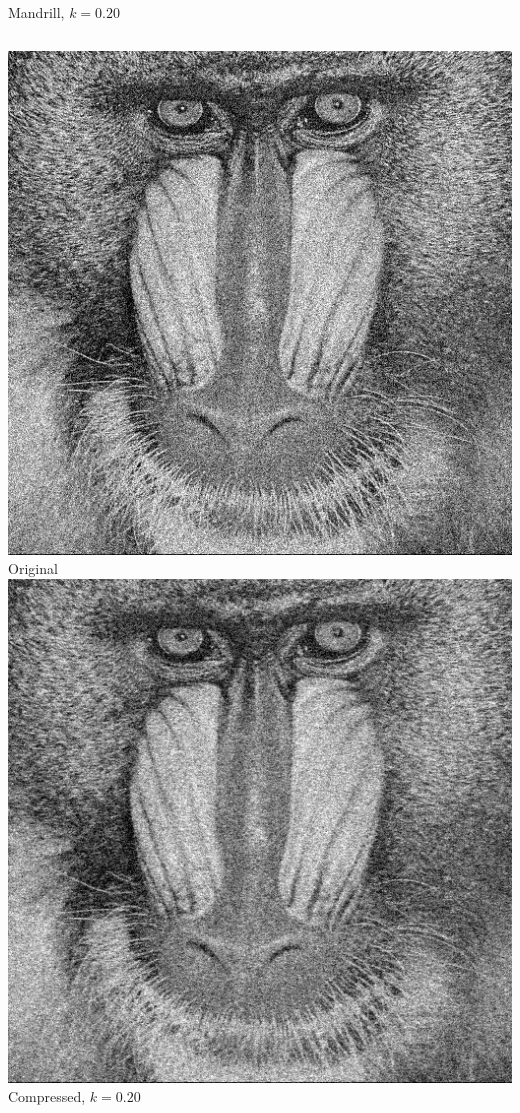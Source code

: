 \documentclass[12pt]{beamer}
\begin{document}
\begin{frame}{Mandrill, \(k=0.20\)}
  \begin{columns}
      \includegraphics[width=\textwidth]{Mandrill.jpg}\\
      \footnotesize Original
      \includegraphics[width=\textwidth]{Mandrill_k20.png}\\
      \footnotesize Compressed, \(k=0.20\)
  \end{columns}
\end{frame}
\end{document}
